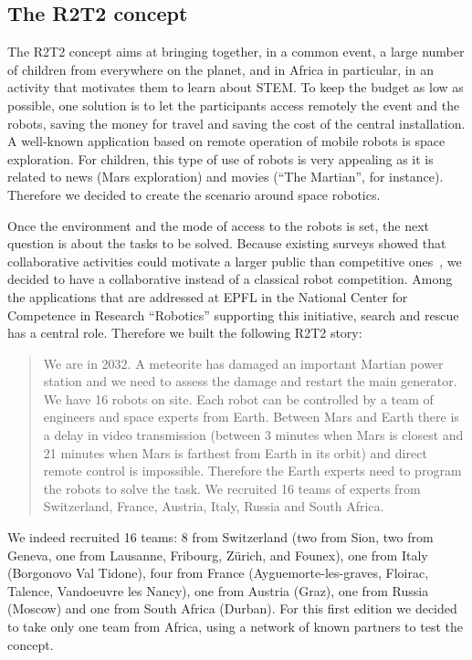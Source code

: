 \documentclass{intech-journal}
\begin{document}
\subsection{The R2T2 concept}

The R2T2 concept aims at bringing together, in a common event, a large number of children from everywhere on the planet, and in Africa in particular, in an activity that motivates them to learn about STEM.
To keep the budget as low as possible, one solution is to let the participants access remotely the event and the robots, saving the money for travel and saving the cost of the central installation.
A well-known application based on remote operation of mobile robots is space exploration.
For children, this type of use of robots is very appealing as it is related to news (Mars exploration) and movies (``The Martian'', for instance).
Therefore we decided to create the scenario around space robotics.

Once the environment and the mode of access to the robots is set, the next question is about the tasks to be solved.
Because existing surveys showed that collaborative activities could motivate a larger public than competitive ones~\cite{riedo2013upgrade}, we decided to have a collaborative instead of a classical robot competition. 
Among the applications that are addressed at EPFL in the National Center for Competence in Research ``Robotics'' supporting this initiative, search and rescue has a central role.
Therefore we built the following R2T2 story:
\begin{quotation}
We are in 2032. A meteorite has damaged an important Martian power station and we need to assess the damage and restart the main generator. We have 16 robots on site. Each robot can be controlled by a team of engineers and space experts from Earth. Between Mars and Earth there is a delay in video transmission (between 3 minutes when Mars is closest and 21 minutes when Mars is farthest from Earth in its orbit) and direct remote control is impossible. Therefore the Earth experts need to program the robots to solve the task. We recruited 16 teams of experts from Switzerland, France, Austria, Italy, Russia and South Africa.
\end{quotation}
We indeed recruited 16 teams: 8 from Switzerland (two from Sion, two from Geneva, one from Lausanne, Fribourg, Z\"urich, and Founex), one from Italy (Borgonovo Val Tidone), four from France (Ayguemorte-les-graves, Floirac, Talence, Vandoeuvre les Nancy), one from Austria (Graz), one from Russia (Moscow) and one from South Africa (Durban). 
For this first edition we decided to take only one team from Africa, using a network of known partners to test the concept.
\end{document}
